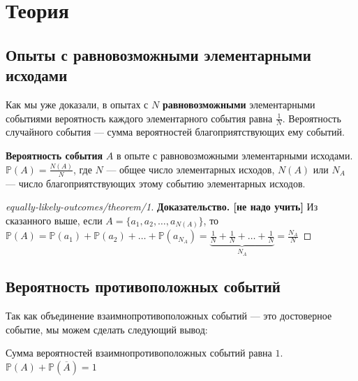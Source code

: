 
\section{Теория}

\subsection{Опыты с равновозможными элементарными исходами}

Как мы уже доказали, в опытах с $N$ \textbf{равновозможными} элементарными событиями вероятность каждого элементарного события равна $\frac{1}{N}$. Вероятность случайного события  —  сумма вероятностей благоприятствующих ему событий.

\begin{theorem}\label{theorem-1}
\textbf{Вероятность события} $A$ в опыте с равновозможными элементарными исходами.\\
 $\mathbb{P}(A) = \frac{N(A)}{N}$, где $N$  —  общее число элементарных исходов, $N(A)$ или $N_A$  —  число благоприятствующих этому событию элементарных исходов.
\end{theorem}

\begin{proof}[equally-likely-outcomes/theorem/1]\label{solution-equally-likely-outcomes-theorem-1}
\textbf{Доказательство. [не надо учить]} Из сказанного выше, если $A= \{a_1,a_2,\dots,a_{N(A)}\}$, то $\mathbb{P}(A) = \mathbb{P}(a_1) + \mathbb{P}(a_2) + \dots + \mathbb{P}(a_{N_A}) =\underbrace{\frac{1}{N} + \frac{1}{N} + \dots + \frac{1}{N}}_{N_A}  = \frac{N_A}{N}$
\end{proof}

\subsection{Вероятность противоположных событий}

Так как объединение взаимнопротивоположных событий  —  это достоверное событие, мы можем сделать следующий вывод:

\begin{theorem}\label{theorem-2}
Сумма вероятностей взаимнопротивоположных событий равна $1$. $\mathbb{P}(A) + \mathbb{P}(\overline{A}) = 1$
\end{theorem}

